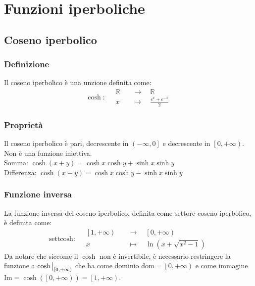 \documentclass[a4paper]{article}
\newcommand\restr[2]{{%
	\left.\kern-\nulldelimiterspace %
	#1 %
	\vphantom{\big|} %
	\right|_{#2} %
	}}
\newcommand\dom{\text{dom}}
\newcommand\Img{\text{Im}}
\newcommand\settcosh{\text{settcosh}}
\begin{document}
\newpage


\section{Funzioni iperboliche}
\subsection{Coseno iperbolico}
\subsubsection*{Definizione}
Il coseno iperbolico è una unzione definita come:
\[\cosh : \quad
\begin{aligned}
	\mathbb{R} \quad &\to \quad \mathbb{R} \\
	x \quad &\mapsto \quad \frac{e^x + e^{-x}}{2}
\end{aligned}
\]

\subsubsection*{Proprietà}
Il coseno iperbolico è pari, decrescente in \(\left( - \infty, 0 \right]\) e decrescente in \(\left[ 0, + \infty \right)\). Non è una funzione iniettiva. \\
Somma: \(\cosh \left( x + y \right) = \cosh x \cosh y + \sinh x \sinh y\) \\
Differenza: \(\cosh \left( x - y \right) = \cosh x \cosh y - \sinh x \sinh y\)

\subsubsection*{Funzione inversa}
La funzione inversa del coseno iperbolico, definita come settore coseno iperbolico, è definita come:
\[\settcosh : \quad
\begin{aligned}
	\left[ 1, + \infty \right) \quad &\to \quad \left[ 0, + \infty \right) \\
	x \quad &\mapsto \quad \ln \left( x + \sqrt{ x^2 - 1 } \right)
\end{aligned}
\]
Da notare che siccome il \(\cosh\) non è invertibile, è necessario restringere la funzione a \(\restr{\cosh}{\left[ 0, + \infty \right)}\)
che ha come dominio \(\dom = \left[ 0, + \infty \right)\) e come immagine \(\Img = \cosh \left( \left[ 0, + \infty \right) \right) = \left[ 1, + \infty \right)\).
\end{document}
